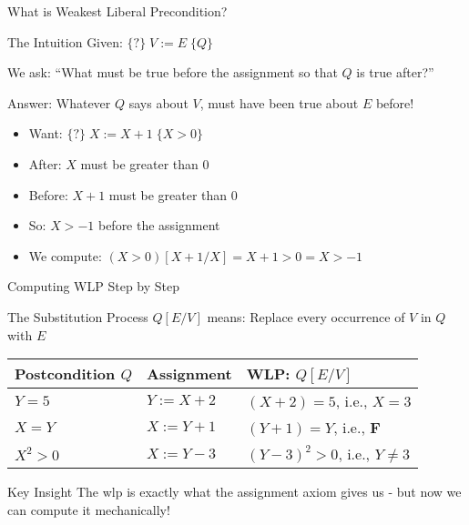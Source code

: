 \begin{frame}{What is Weakest Liberal Precondition?}
    \begin{block}{The Intuition}
        Given: $\{?\} \; V:=E \; \{Q\}$
        
        We ask: ``What must be true before the assignment so that $Q$ is true after?''
        
        Answer: Whatever $Q$ says about $V$, must have been true about $E$ before!
    \end{block}
    
    \begin{example}
        \begin{itemize}
            \item Want: $\{?\} \; X:=X+1 \; \{X>0\}$
            \item After: $X$ must be greater than 0
            \item Before: $X+1$ must be greater than 0
            \item So: $X > -1$ before the assignment
            \item We compute: $(X>0)[X+1/X] = X+1>0 = X>-1$
        \end{itemize}
    \end{example}
\end{frame}

\begin{frame}{Computing WLP Step by Step}
    \begin{block}{The Substitution Process}
        $Q[E/V]$ means: Replace every occurrence of $V$ in $Q$ with $E$
    \end{block}
    
    \begin{example}
        \begin{tabular}{l|l|l}
            \textbf{Postcondition $Q$} & \textbf{Assignment} & \textbf{WLP: $Q[E/V]$} \\
            \hline
            $Y = 5$ & $Y := X + 2$ & $(X + 2) = 5$, i.e., $X = 3$ \\
            $X = Y$ & $X := Y + 1$ & $(Y + 1) = Y$, i.e., $\mathbf{F}$ \\
            $X^2 > 0$ & $X := Y - 3$ & $(Y - 3)^2 > 0$, i.e., $Y \neq 3$ \\
        \end{tabular}
    \end{example}
    
    \begin{alertblock}{Key Insight}
        The wlp is exactly what the assignment axiom gives us - but now we can compute it mechanically!
    \end{alertblock}
\end{frame}

